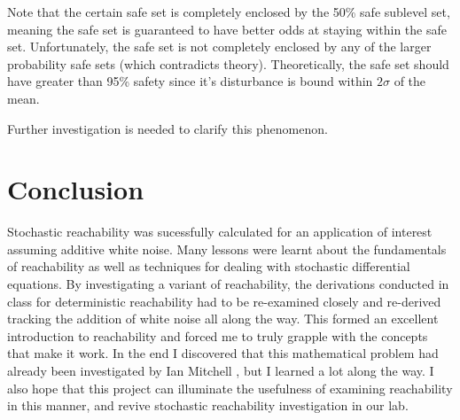 \documentclass[a4paper]{article}
\begin{document}
Note that the certain safe set is completely enclosed by the 50\% safe sublevel set, meaning the safe set is guaranteed to have better odds at staying within the safe set.
Unfortunately, the safe set is not completely enclosed by any of the larger probability safe sets (which contradicts theory).
Theoretically, the safe set should have greater than 95\% safety since it's disturbance is bound within $2\sigma$ of the mean.

Further investigation is needed to clarify this phenomenon.

\section{Conclusion}
Stochastic reachability was sucessfully calculated for an application of interest assuming additive white noise.
Many lessons were learnt about the fundamentals of reachability as well as techniques for dealing with stochastic differential equations.
By investigating a variant of reachability, the derivations conducted in class for deterministic reachability had to be re-examined closely and re-derived tracking the addition of white noise all along the way.
This formed an excellent introduction to reachability and forced me to truly grapple with the concepts that make it work.
In the end I discovered that this mathematical problem had already been investigated by Ian Mitchell \cite{MitchellToolbox}, but I learned a lot along the way.
I also hope that this project can illuminate the usefulness of examining reachability in this manner, and revive stochastic reachability investigation in our lab.

  
  
\end{document}
